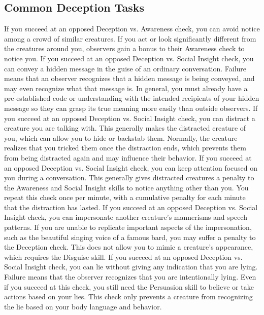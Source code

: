   \subsection{Common Deception Tasks}
     If you succeed at an opposed Deception vs. Awareness check, you can avoid notice among a crowd of similar creatures.
    If you act or look significantly different from the creatures around you, observers gain a bonus to their Awareness check to notice you.
     If you succeed at an opposed Deception vs. Social Insight check, you can convey a hidden message in the guise of an ordinary conversation.
    Failure means that an observer recognizes that a hidden message is being conveyed, and may even recognize what that message is.
    In general, you must already have a pre-established code or understanding with the intended recipients of your hidden message so they can grasp its true meaning more easily than outside observers.
     If you succeed at an opposed Deception vs. Social Insight check, you can distract a creature you are talking with.
    This generally makes the distracted creature  \partiallyunaware of you, which can allow you to hide or backstab them.
    Normally, the creature realizes that you tricked them once the distraction ends, which prevents them from being distracted again and may influence their behavior.
     If you succeed at an opposed Deception vs. Social Insight check, you can keep attention focused on you during a conversation.
    This generally gives distracted creatures a  penalty to the Awareness and Social Insight skills to notice anything other than you.
    You repeat this check once per minute, with a cumulative  penalty for each minute that the distraction has lasted.
     If you succeed at an opposed Deception vs. Social Insight check, you can impersonate another creature's mannerisms and speech patterns.
    If you are unable to replicate important aspects of the impersonation, such as the beautiful singing voice of a famous bard, you may suffer a penalty to the Deception check.
    This does not allow you to mimic a creature's appearance, which requires the Disguise skill.
     If you succeed at an opposed Deception vs. Social Insight check, you can lie without giving any indication that you are lying.
    Failure means that the observer recognizes that you are intentionally lying.
    Even if you succeed at this check, you still need the Persuasion skill to believe or take actions based on your lies.
    This check only prevents a creature from recognizing the lie based on your body language and behavior.

